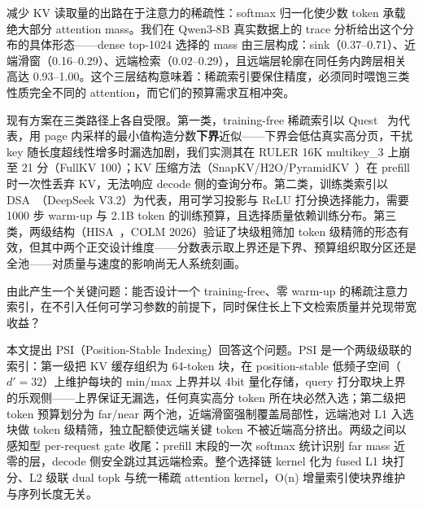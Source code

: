 \documentclass[11pt]{article}
\begin{document}
减少 KV 读取量的出路在于注意力的稀疏性：softmax 归一化使少数 token 承载绝大部分 attention mass。我们在 Qwen3-8B 真实数据上的 trace 分析给出这个分布的具体形态——dense top-1024 选择的 mass 由三层构成：sink（0.37--0.71）、近端滑窗（0.16--0.29）、远端检索（0.02--0.29），且远端层轮廓在同任务内跨层相关高达 0.93--1.00。这个三层结构意味着：稀疏索引要保住精度，必须同时喂饱三类性质完全不同的 attention，而它们的预算需求互相冲突。

现有方案在三类路径上各自受限。第一类，training-free 稀疏索引以 Quest~\cite{quest} 为代表，用 page 内采样的最小值构造分数\textbf{下界}近似——下界会低估真实高分页，干扰 key 随长度超线性增多时漏选加剧，我们实测其在 RULER 16K multikey\_3 上崩至 21 分（FullKV 100）；KV 压缩方法（SnapKV/H2O/PyramidKV~\cite{snapkv,h2o,pyramidkv}）在 prefill 时一次性丢弃 KV，无法响应 decode 侧的查询分布。第二类，训练类索引以 DSA~\cite{dsa}（DeepSeek V3.2）为代表，用可学习投影与 ReLU 打分换选择能力，需要 1000 步 warm-up 与 2.1B token 的训练预算，且选择质量依赖训练分布。第三类，两级结构（HISA~\cite{hisa}，COLM 2026）验证了块级粗筛加 token 级精筛的形态有效，但其中两个正交设计维度——分数表示取上界还是下界、预算组织取分区还是全池——对质量与速度的影响尚无人系统刻画。

由此产生一个关键问题：能否设计一个 training-free、零 warm-up 的稀疏注意力索引，在不引入任何可学习参数的前提下，同时保住长上下文检索质量并兑现带宽收益？

本文提出 PSI（Position-Stable Indexing）回答这个问题。PSI 是一个两级级联的索引：第一级把 KV 缓存组织为 64-token 块，在 position-stable 低频子空间（$d'{=}32$）上维护每块的 min/max 上界并以 4bit 量化存储，query 打分取块上界的乐观侧——上界保证无漏选，任何真实高分 token 所在块必然入选；第二级把 token 预算划分为 far/near 两个池，近端滑窗强制覆盖局部性，远端池对 L1 入选块做 token 级精筛，独立配额使远端关键 token 不被近端高分挤出。两级之间以感知型 per-request gate 收尾：prefill 末段的一次 softmax 统计识别 far mass 近零的层，decode 侧安全跳过其远端检索。整个选择链 kernel 化为 fused L1 块打分、L2 级联 dual topk 与统一稀疏 attention kernel，O(n) 增量索引使块界维护与序列长度无关。
\end{document}

